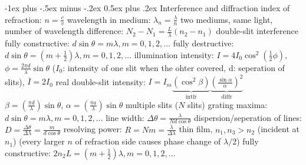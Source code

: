 \documentclass[10pt,landscape]{article}
\makeatletter
\renewcommand{\subsection}{\@startsection{subsection}{2}{0mm}%
                                {-1ex plus -.5ex minus -.2ex}%
                                {0.5ex plus .2ex}%
                                {\normalfont\normalsize\bfseries}}
\newcommand{\spc}{\hspace*{1em}}
\makeatother
\begin{document}
\begin{multicols*}{3}
\subsection{Interference and diffraction}
index of refraction: $n=\frac{c}{v}$
\newline
wavelength in medium: $\lambda _n=\frac{\lambda }{n}$
\newline
two mediums, same light, number of wavelength difference: 
\newline
\spc $N_2-N_1=\frac{L}{\lambda }(n_2-n_1)$
\newline \newline
double-slit interference
\newline
\spc fully constructive: $d\sin\theta =m\lambda,m=0,1,2,...$
\newline
\spc fully destructive: $d\sin\theta =(m+\frac{1}{2})\lambda,m=0,1,2,...$
\newline
\spc illumination intensity: $I=4I_0\cos ^2(\frac{1}{2}\phi)$, $\phi=\frac{2 \pi d}{\lambda} \sin \theta $ 
\newline
\spc\spc ($I_0$: intensity of one slit when the ohter covered, d: seperation of slits), $\overline{I}=2I_0$
\newline \newline
real double-slit
\newline
\spc intensity: $I=I_m\underbrace{(\cos ^2 \beta )}_{\textrm{intfr}}\underbrace{(\tfrac{\sin \alpha}{\alpha})^2}_{\textrm{diffr}}$
\newline
\spc \spc $\beta =(\frac{\pi d}{\lambda })\sin \theta $, $\alpha =(\frac{\pi a}{\lambda})\sin \theta $
\newline \newline
multiple slits ($N$ slits)
\newline
\spc grating maxima: $d\sin\theta =m\lambda,m=0,1,2,...$
\newline
\spc line width: $\Delta \theta =\frac{\lambda }{Nd\cos \theta }$
\newline
\spc dispersion/seperation of lines: $D=\frac{\Delta \theta }{\Delta \lambda }=\frac{m}{d\cos \theta }$
\newline
\spc resolving power: $R=Nm=\frac{\overline{\lambda} }{\Delta \lambda }$
\newline \newline
thin film, $n_1,n_3>n_2$ (incident at $n_1$)
\newline
(every larger $n$ of refraction side causes phase change of $\lambda/2$)
\newline
\spc fully constructive: $2n_2L=(m+\frac{1}{2})\lambda ,m=0,1,2,...$

\end{multicols*}
\end{document}
